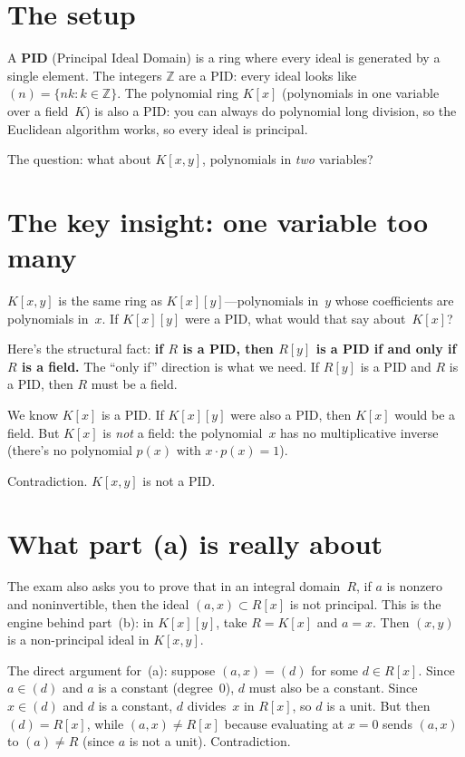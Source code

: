 \section{The setup}

A \textbf{PID} (Principal Ideal Domain) is a ring where every ideal is
generated by a single element. The integers $\mathbb{Z}$ are a PID: every
ideal looks like $(n) = \{nk : k \in \mathbb{Z}\}$. The polynomial ring
$K[x]$ (polynomials in one variable over a field~$K$) is also a PID:
you can always do polynomial long division, so the Euclidean algorithm
works, so every ideal is principal.

The question: what about $K[x, y]$, polynomials in \emph{two} variables?

\section{The key insight: one variable too many}

$K[x, y]$ is the same ring as $K[x][y]$---polynomials in~$y$ whose
coefficients are polynomials in~$x$. If $K[x][y]$ were a PID, what
would that say about~$K[x]$?

Here's the structural fact: \textbf{if $R$ is a PID, then $R[y]$ is a
PID if and only if $R$ is a field.} The ``only if'' direction is what
we need. If $R[y]$ is a PID and $R$ is a PID, then $R$ must be a field.

We know $K[x]$ is a PID. If $K[x][y]$ were also a PID, then $K[x]$
would be a field. But $K[x]$ is \emph{not} a field: the polynomial~$x$
has no multiplicative inverse (there's no polynomial $p(x)$ with
$x \cdot p(x) = 1$).

Contradiction. $K[x, y]$ is not a PID.

\section{What part (a) is really about}

The exam also asks you to prove that in an integral domain~$R$, if $a$
is nonzero and noninvertible, then the ideal $(a, x) \subset R[x]$ is
not principal. This is the engine behind part~(b): in $K[x][y]$,
take $R = K[x]$ and $a = x$. Then $(x, y)$ is a non-principal ideal
in $K[x, y]$.

The direct argument for~(a): suppose $(a, x) = (d)$ for some $d \in R[x]$.
Since $a \in (d)$ and $a$ is a constant (degree~$0$), $d$ must also be a
constant. Since $x \in (d)$ and $d$ is a constant, $d$ divides~$x$ in
$R[x]$, so $d$ is a unit. But then $(d) = R[x]$, while $(a, x) \ne R[x]$
because evaluating at $x = 0$ sends $(a, x)$ to $(a) \ne R$ (since $a$
is not a unit). Contradiction.

